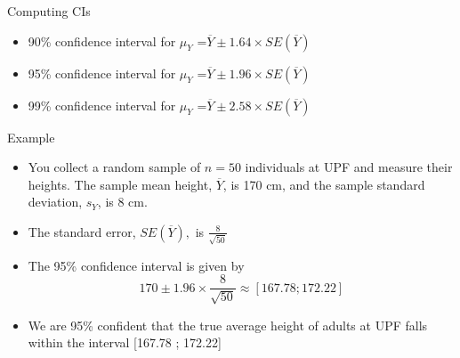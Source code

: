 \documentclass[notes,10pt, aspectratio=169]{beamer}
\begin{document}
\begin{frame}{Computing CIs}
\begin{itemize}
    \item 90\% confidence interval for $\mu_Y$  =$\overline{Y}\pm 1.64 \times SE(\overline{Y})$
    \item 95\% confidence interval for $\mu_Y$  =$\overline{Y}\pm 1.96 \times SE(\overline{Y})$
    \item 99\% confidence interval for $\mu_Y$  =$\overline{Y}\pm 2.58 \times SE(\overline{Y})$
\end{itemize}

\begin{block}{Example}
\begin{itemize}
    \item You collect a random sample of $n=50$ individuals at UPF and measure their heights. The sample mean height, $\overline{Y}$, is 170 cm, and the sample standard deviation, $s_Y$, is 8 cm.
    \item The standard error, $SE(\overline{Y}),$ is $\frac{8}{\sqrt{50}}$
    \item The 95\% confidence interval is given by
    \begin{equation*}
        170 \pm 1.96 \times \frac{8}{\sqrt{50}} \approx [167.78 ; 172.22]
    \end{equation*}
    \item We are 95\% confident that the true average height of adults at UPF falls within the interval [167.78 ; 172.22]
\end{itemize}
\end{block}
\end{frame}
\end{document}
